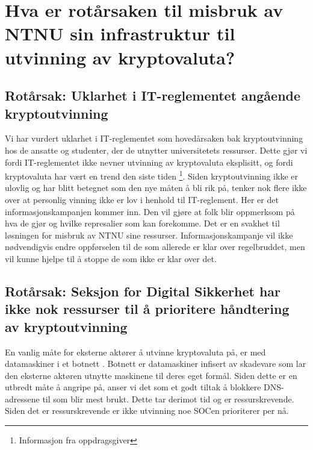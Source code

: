 \section{Hva er rotårsaken til misbruk av NTNU sin infrastruktur til utvinning av kryptovaluta?}
\subsection*{Rotårsak: Uklarhet i IT-reglementet angående kryptoutvinning}
Vi har vurdert uklarhet i IT-reglementet som hovedårsaken bak kryptoutvinning hos de ansatte og studenter, der de utnytter universitetets ressurser. Dette gjør vi fordi IT-reglementet ikke nevner utvinning av kryptovaluta eksplisitt, og fordi kryptovaluta har vært en trend den siste tiden \footnote{Informasjon fra oppdragsgiver}. Siden kryptoutvinning ikke er ulovlig og har blitt betegnet som den nye måten å bli rik på, tenker nok flere ikke over at personlig vinning ikke er lov i henhold til IT-reglement. Her er det informasjonskampanjen kommer inn. Den vil gjøre at folk blir oppmerksom på hva de gjør og hvilke represalier som kan forekomme. Det er en svakhet til løsningen for misbruk av NTNU sine ressurser. Informasjonskampanje vil ikke nødvendigvis endre oppførselen til de som allerede er klar over regelbruddet, men vil kunne hjelpe til å stoppe de som ikke er klar over det.


\subsection*{Rotårsak: Seksjon for Digital Sikkerhet har ikke nok ressurser til å prioritere håndtering av kryptoutvinning}
En vanlig måte for eksterne aktører å utvinne kryptovaluta på, er med datamaskiner i et botnett \cite{Botnet}. Botnett er datamaskiner infisert av skadevare som lar den eksterne aktøren utnytte maskinene til deres eget formål. Siden dette er en utbredt måte å angripe på, anser vi det som et godt tiltak å blokkere DNS-adressene til som blir mest brukt. Dette tar derimot tid og er ressurskrevende. Siden det er ressurskrevende er ikke utvinning noe SOCen prioriterer per nå.

